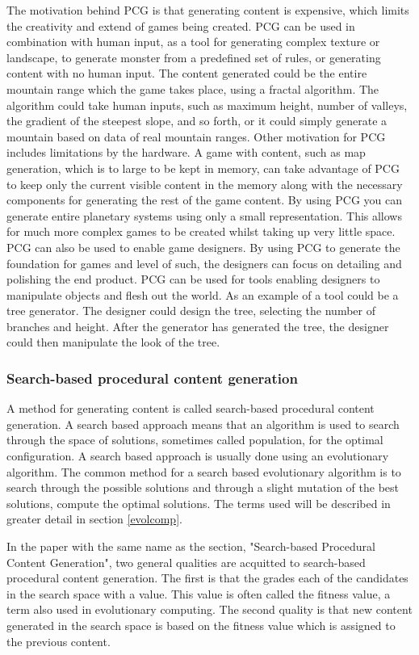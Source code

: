 \documentclass[a4paper,11pt]{article}
\begin{document}
The motivation behind PCG is that generating content is expensive, which limits the creativity and extend of games being created. PCG can be used in combination with human input, as a tool for generating complex texture or landscape, to generate monster from a predefined set of rules, or generating content with no human input. The content generated could be the entire mountain range which the game takes place, using a fractal algorithm. The algorithm could take human inputs, such as maximum height, number of valleys, the gradient of the steepest slope, and so forth, or it could simply generate a mountain based on data of real mountain ranges. 
Other motivation for PCG includes limitations by the hardware. A game with content, such as map generation, which is to large to be kept in memory, can take advantage of PCG to keep only the current visible content in the memory along with the necessary components for generating the rest of the game content. By using PCG you can generate entire planetary systems using only a small representation. This allows for much more complex games to be created whilst taking up very little space.
PCG can also be used to enable game designers. By using PCG to generate the foundation for games and level of such, the designers can focus on detailing and polishing the end product. PCG can be used for tools enabling designers to manipulate objects and flesh out the world. As an example of a tool could be a tree generator. The designer could design the tree, selecting the number of branches and height. After the generator has generated the tree, the designer could then manipulate the look of the tree.

\subsubsection{Search-based procedural content generation}
A method for generating content is called search-based procedural content generation. A search based approach means that an algorithm is used to search through the space of solutions, sometimes called population, for the optimal configuration. A search based approach is usually done using an evolutionary algorithm. The common method for a search based evolutionary algorithm is to search through the possible solutions and through a slight mutation of the best solutions, compute the optimal solutions. The terms used will be described in greater detail in section \ref{evolcomp}.

In the paper with the same name as the section, "Search-based Procedural Content Generation"\cite{searchbased}, two general qualities are acquitted to search-based procedural content generation. The first is that the grades each of the candidates in the search space with a value. This value is often called the fitness value, a term also used in evolutionary computing. The second quality is that new content generated in the search space is based on the fitness value which is assigned to the previous content. 
\end{document}

